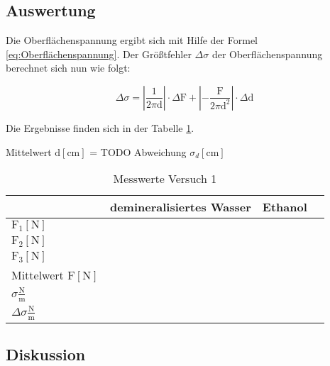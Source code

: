         \subsection{Auswertung}

        Die Oberflächenspannung ergibt sich mit Hilfe der Formel \ref{eq:Oberflächenspannung}.
        Der Größtfehler $\Delta \sigma$ der Oberflächenspannung berechnet sich nun wie folgt:

        \begin{equation}
            \Delta \sigma = \left| \frac{1}{2 \pi \mathrm{d}} \right| \cdot \Delta \mathrm{F} + \left| -\frac{\mathrm{F}}{2 \pi \mathrm{d}^2} \right| \cdot \Delta \mathrm{d} 
            \label{eq:Größtfehler}
        \end{equation}

        Die Ergebnisse finden sich in der Tabelle \ref{tab:Versuch1_Ergebnisse}.

        Mittelwert $\mathrm{d[cm]}$ = TODO
        Abweichung $\sigma_d \mathrm{[cm]}$

        \begin{table}[H]
            \centering
            \caption{Messwerte Versuch 1}
            \label{tab:Versuch1_Ergebnisse}
            \vspace*{1em}
            \begin{tabular}{|l|l|l|l|}
                \hline
                 & demineralisiertes Wasser & Ethanol \\
                \hline
                $\mathrm{F_1 [N]}$ &  & \\
                \hline
                $\mathrm{F_2 [N]}$ & & \\
                \hline
                $\mathrm{F_3 [N]}$ &  & \\
                \hline
                Mittelwert $\mathrm{F [N]}$ & & \\
                \hline
                $\sigma \frac{\mathrm{N}}{\mathrm{m}}$ & & \\
                \hline
                $\Delta \sigma \frac{\mathrm{N}}{\mathrm{m}}$ & & \\
                \hline
            \end{tabular}
        \end{table}
        
        \subsection{Diskussion}

